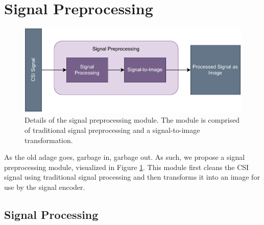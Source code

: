 \section{Signal Preprocessing}\label{sec:methodology-signal-preprocessing}

\begin{figure}
	\centering
	\includegraphics[width=0.8\linewidth]{figures/signal_preprocessing_diagram.pdf}
	\caption{Details of the signal preprocessing module. The module is comprised of traditional signal preprocessing and a signal-to-image transformation.}
	\label{fig:signal-preprocessing-diagram}
\end{figure}

As the old adage goes, garbage in, garbage out.
As such, we propose a signal preprocessing module, visualized in Figure \ref{fig:signal-preprocessing-diagram}.
This module first cleans the CSI signal using traditional signal processing and then transforms it into an image for use by the signal encoder.

\subsection{Signal Processing}

